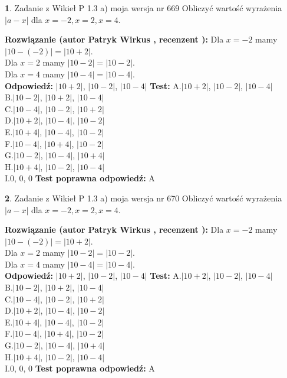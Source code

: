 \documentclass[12pt, a4paper]{article}
\theoremstyle{definition} %
\newtheorem{zad}{}
\newcommand{\zadStart}[1]{\begin{zad}#1\newline}
\newcommand{\zadStop}{\end{zad}}
\newcommand{\rozwStart}[2]{\noindent \textbf{Rozwiązanie (autor #1 , recenzent #2): }\newline}
\newcommand{\rozwStop}{\newline}
\newcommand{\odpStart}{\noindent \textbf{Odpowiedź:}\newline}
\newcommand{\odpStop}{\newline}
\newcommand{\testStart}{\noindent \textbf{Test:}\newline}
\newcommand{\testStop}{\newline}
\newcommand{\kluczStart}{\noindent \textbf{Test poprawna odpowiedź:}\newline}
\newcommand{\kluczStop}{\newline}
\begin{document}
\zadStart{Zadanie z Wikieł P 1.3 a) moja wersja nr 669}
Obliczyć wartość wyrażenia $|a - x|$ dla $x=-2,x=2,x=4$.
\zadStop
\rozwStart{Patryk Wirkus}{}
Dla $x = -2$ mamy $|10 - (-2)| = |10 + 2|$.\\
Dla $x = 2$ mamy $|10 - 2| = |10 - 2|$.\\
Dla $x = 4$ mamy $|10 - 4| = |10 - 4|$.\\
\rozwStop
\odpStart
$|10 + 2|$, $|10 - 2|$, $|10 - 4|$
\odpStop
\testStart
A.$|10 + 2|$, $|10 - 2|$, $|10 - 4|$\\
B.$|10 - 2|$, $|10 + 2|$, $|10 - 4|$\\
C.$|10 - 4|$, $|10 - 2|$, $|10 + 2|$\\
D.$|10 + 2|$, $|10 - 4|$, $|10 - 2|$\\
E.$|10 + 4|$, $|10 - 4|$, $|10 - 2|$\\
F.$|10 - 4|$, $|10 + 4|$, $|10 - 2|$\\
G.$|10 - 2|$, $|10 - 4|$, $|10 + 4|$\\
H.$|10 + 4|$, $|10 - 2|$, $|10 - 4|$\\
I.$0$, $0$, $0$
\testStop
\kluczStart
A
\kluczStop



\zadStart{Zadanie z Wikieł P 1.3 a) moja wersja nr 670}
Obliczyć wartość wyrażenia $|a - x|$ dla $x=-2,x=2,x=4$.
\zadStop
\rozwStart{Patryk Wirkus}{}
Dla $x = -2$ mamy $|10 - (-2)| = |10 + 2|$.\\
Dla $x = 2$ mamy $|10 - 2| = |10 - 2|$.\\
Dla $x = 4$ mamy $|10 - 4| = |10 - 4|$.\\
\rozwStop
\odpStart
$|10 + 2|$, $|10 - 2|$, $|10 - 4|$
\odpStop
\testStart
A.$|10 + 2|$, $|10 - 2|$, $|10 - 4|$\\
B.$|10 - 2|$, $|10 + 2|$, $|10 - 4|$\\
C.$|10 - 4|$, $|10 - 2|$, $|10 + 2|$\\
D.$|10 + 2|$, $|10 - 4|$, $|10 - 2|$\\
E.$|10 + 4|$, $|10 - 4|$, $|10 - 2|$\\
F.$|10 - 4|$, $|10 + 4|$, $|10 - 2|$\\
G.$|10 - 2|$, $|10 - 4|$, $|10 + 4|$\\
H.$|10 + 4|$, $|10 - 2|$, $|10 - 4|$\\
I.$0$, $0$, $0$
\testStop
\kluczStart
A
\kluczStop
\end{document}
